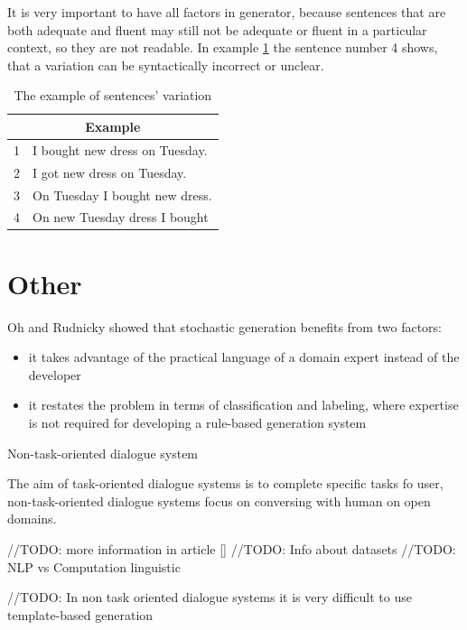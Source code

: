 It is very important to have all factors in generator, because sentences that are both adequate and fluent may still not be adequate or fluent in a particular context, so they are not readable.
In example \ref{tab:var_example} the sentence number 4 shows, that a variation can be syntactically incorrect or unclear.

\begin{table}[t]
\centering
 \begin{tabular}{|p{0.5cm}|p{8cm}|} 
 \hline
 \multicolumn{2}{|c|}{Example} \\
 \hline
 1 & I bought new dress on Tuesday. \\ 
 \hline
 2 & I got new dress on Tuesday. \\
 \hline
 3 & On Tuesday I bought new dress. \\
 \hline
 4 & On new Tuesday dress I bought \\
 \hline
 \end{tabular}
 \caption{The example of sentences' variation}
\label{tab:var_example}
\end{table}

\chapter{Other}
Oh and Rudnicky showed that stochastic generation benefits from two factors: 
\begin{itemize}
  \item it takes advantage of the practical language of a domain expert instead of the developer
  \item it restates the problem in terms of classification and labeling, where expertise is not required for developing a rule-based generation system
\end{itemize}

Non-task-oriented dialogue system

The aim of task-oriented dialogue systems is to complete specific tasks fo user, non-task-oriented dialogue systems focus on conversing with human on open domains. 

//TODO: more information in article []
//TODO: Info about datasets
//TODO: NLP vs Computation linguistic

//TODO: In non task oriented dialogue systems it is very difficult to use template-based generation
\cite{stochastic_language_generation_ds}
